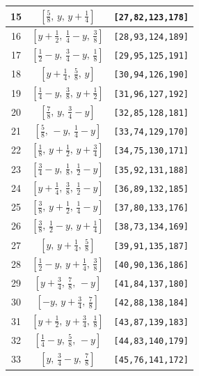 \documentclass[fleqn,8pt]{jsarticle}
\begin{document}
\begin{longtable}{ccc}
15 & $\left[ \frac{5}{8},\, y,\, y + \frac{1}{4} \right]$ & {\tt [27,82,123,178]} \\ \hline
16 & $\left[ y + \frac{1}{2},\, \frac{1}{4} - y,\, \frac{3}{8} \right]$ & {\tt [28,93,124,189]} \\ \hline
17 & $\left[ \frac{1}{2} - y,\, \frac{3}{4} - y,\, \frac{1}{8} \right]$ & {\tt [29,95,125,191]} \\ \hline
18 & $\left[ y + \frac{1}{4},\, \frac{5}{8},\, y \right]$ & {\tt [30,94,126,190]} \\ \hline
19 & $\left[ \frac{1}{4} - y,\, \frac{3}{8},\, y + \frac{1}{2} \right]$ & {\tt [31,96,127,192]} \\ \hline
20 & $\left[ \frac{7}{8},\, y,\, \frac{3}{4} - y \right]$ & {\tt [32,85,128,181]} \\ \hline
21 & $\left[ \frac{5}{8},\, - y,\, \frac{1}{4} - y \right]$ & {\tt [33,74,129,170]} \\ \hline
22 & $\left[ \frac{1}{8},\, y + \frac{1}{2},\, y + \frac{3}{4} \right]$ & {\tt [34,75,130,171]} \\ \hline
23 & $\left[ \frac{3}{4} - y,\, \frac{1}{8},\, \frac{1}{2} - y \right]$ & {\tt [35,92,131,188]} \\ \hline
24 & $\left[ y + \frac{1}{4},\, \frac{3}{8},\, \frac{1}{2} - y \right]$ & {\tt [36,89,132,185]} \\ \hline
25 & $\left[ \frac{3}{8},\, y + \frac{1}{2},\, \frac{1}{4} - y \right]$ & {\tt [37,80,133,176]} \\ \hline
26 & $\left[ \frac{3}{8},\, \frac{1}{2} - y,\, y + \frac{1}{4} \right]$ & {\tt [38,73,134,169]} \\ \hline
27 & $\left[ y,\, y + \frac{1}{4},\, \frac{5}{8} \right]$ & {\tt [39,91,135,187]} \\ \hline
28 & $\left[ \frac{1}{2} - y,\, y + \frac{1}{4},\, \frac{3}{8} \right]$ & {\tt [40,90,136,186]} \\ \hline
29 & $\left[ y + \frac{3}{4},\, \frac{7}{8},\, - y \right]$ & {\tt [41,84,137,180]} \\ \hline
30 & $\left[ - y,\, y + \frac{3}{4},\, \frac{7}{8} \right]$ & {\tt [42,88,138,184]} \\ \hline
31 & $\left[ y + \frac{1}{2},\, y + \frac{3}{4},\, \frac{1}{8} \right]$ & {\tt [43,87,139,183]} \\ \hline
32 & $\left[ \frac{1}{4} - y,\, \frac{5}{8},\, - y \right]$ & {\tt [44,83,140,179]} \\ \hline
33 & $\left[ y,\, \frac{3}{4} - y,\, \frac{7}{8} \right]$ & {\tt [45,76,141,172]} \\ \hline

\end{longtable}
\end{document}
